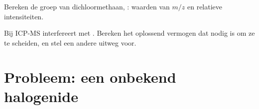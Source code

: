 \begin{exercise}[$\star\star\star$]\label{exo:b2:mass-spec-atomic:11}
Bereken de groep  van dichloormethaan, : waarden van $m/z$ en relatieve
intensiteiten.
\end{exercise}

\begin{exercise}[$\star\star\star$]\label{exo:b2:mass-spec-atomic:12}
Bij ICP-MS interfereert  met . Bereken het oplossend vermogen dat nodig is om
ze te scheiden, en stel een andere uitweg voor.
\end{exercise}

\section{Probleem: een onbekend halogenide}

